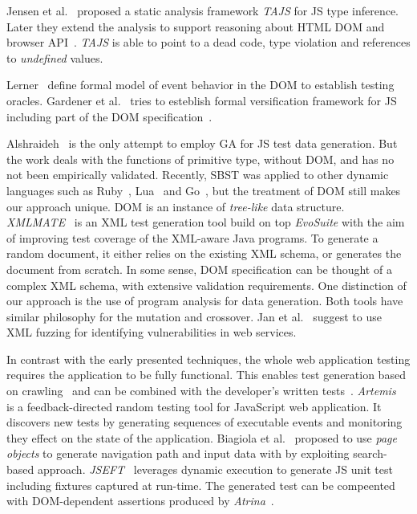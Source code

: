 
Jensen et al.~\cite{tajs2009} proposed a static analysis framework \emph{TAJS} for JS type inference. Later they extend the analysis to support reasoning about HTML DOM and browser API~\cite{dom2011}. \emph{TAJS} is able to point to a dead code, type violation and references to \emph{undefined} values.

Lerner~\cite{lerner2012modeling} define formal model of event behavior in the DOM to establish testing oracles. Gardener et al.~\cite{gardner2012towards} tries to esteblish formal versification framework for JS including part of the DOM specification~\cite{gardner2008local}.

Alshraideh~\cite{alshraideh2008complete} is the only attempt to employ GA for JS test data generation. But the work deals with the functions of primitive type, without DOM, and has no not been empirically validated. Recently, SBST was applied to other dynamic languages such as Ruby~\cite{mairhofer2011search}, Lua~\cite{wibowo2015unit} and Go~\cite{irawan2016test}, but the treatment of DOM still makes our approach unique. DOM is an instance of \emph{tree-like} data structure. \emph{XMLMATE}~\cite{havrikov2014xmlmate} is an XML test generation tool build on top \emph{EvoSuite} with the aim of improving test coverage of the XML-aware Java programs. To generate a random document, it either relies on the  existing XML schema, or generates the document from scratch. In some sense, DOM specification can be thought of a complex XML schema, with extensive validation requirements. One distinction of our approach is the use of program analysis for data generation. Both tools have similar philosophy for the mutation and crossover. Jan et al.~\cite{jan2016automated} suggest to use XML fuzzing for identifying vulnerabilities in web services.

In contrast with the early presented techniques, the whole web application testing requires the application to be fully functional. This enables test generation based on crawling~\cite{mesbah2012invariant} and can be combined with the developer's written tests~\cite{milani2014leveraging}. \emph{Artemis}~\cite{artemis2011} is a feedback-directed random testing tool for JavaScript web application. It discovers new tests by generating sequences of executable events and monitoring they effect on the state of the application. Biagiola et al.~\cite{biagiola2017search} proposed to use \emph{page objects} to generate navigation path and input data with by exploiting search-based approach. \emph{JSEFT}~\cite{mirshokraie2015jseft} leverages dynamic execution to generate JS unit test including fixtures captured at run-time. The generated test can be compeented with DOM-dependent assertions produced by \emph{Atrina}~\cite{icst16}.

